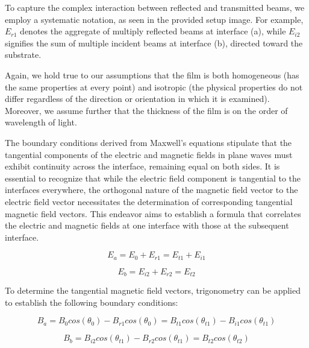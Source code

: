 To capture the complex interaction between reflected and transmitted beams, we employ a systematic notation, as seen in the provided setup image. For example, $E_{r1}$ denotes the aggregate of multiply reflected beams at interface (a), while $E_{i2}$ signifies the sum of multiple incident beams at interface (b), directed toward the substrate. %

Again, we hold true to our assumptions that the film is both homogeneous (has the same properties at every point) and isotropic (the physical properties do not differ regardless of the direction or orientation in which it is examined). Moreover, we assume further that the thickness of the film is on the order of wavelength of light.

The boundary conditions derived from Maxwell's equations stipulate that the tangential components of the electric and magnetic fields in plane waves must exhibit continuity across the interface, remaining equal on both sides. It is essential to recognize that while the electric field component is tangential to the interfaces everywhere, the orthogonal nature of the magnetic field vector to the electric field vector necessitates the determination of corresponding tangential magnetic field vectors. This endeavor aims to establish a formula that correlates the electric and magnetic fields at one interface with those at the subsequent interface. %

    \begin{equation} \label{E_a - Multilayer films electric field boundary equations}
    E_a = E_0 + E_{r1} = E_{t1} + E_{i1}
    \end{equation}
    
    \begin{equation} \label{E_b - Multilayer films electric field boundary equations}
    E_b = E_{i2} + E_{r2} = E_{t2}
    \end{equation}

To determine the tangential magnetic field vectors, trigonometry can be applied to establish the following boundary conditions:

    \begin{equation} \label{B_a - Multilayer films magnetic field boundary equations}
    B_a = B_0cos(\theta_0) - B_{r1}cos(\theta_0) = B_{t1}cos(\theta_{t1}) - B_{i1}cos(\theta_{t1})
    \end{equation}

    \begin{equation} \label{B_b - Multilayer films magnetic field boundary equations}
    B_b = B_{i2}cos(\theta_{t1}) - B_{r2}cos(\theta_{t1}) = B_{t2}cos(\theta_{t2})
    \end{equation}

